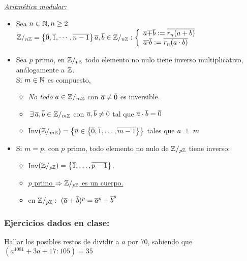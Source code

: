 \textit{\underline{Aritmética modular:}}

\newcommand{\moduloN}[1]{\enteros/_{#1\enteros}}

\begin{itemize}
	\item Sea $n \in \mathbb N, n\geq2$\\
	      $
		      \moduloN{n} = \set{\clase{0},\clase{1},\cdots, \clase{n-1} }\\
		      \clase{a},\clase{b} \en \moduloN n:
		      \llave{l}{
			      \clase{a} \clase{+} \clase{b} := \overline{r_n(a+b)} \\
			      \clase{a} \clase{\cdot} \clase{b} := \overline{r_n(a\cdot b)}
		      }
	      $
	\item Sea $p$ primo, en $\moduloN{p}$ todo elemento no nulo tiene inverso multiplicativo,
	      análogamente a $\mathbb Z$.\\
	      Si $m \in \mathbb N$ es compuesto,

	      \begin{itemize}
		      \item \textit{No todo} $\clase{a} \en \moduloN{m}$ con $\overline{a} \neq \overline{0}$ es inversible.

		      \item $\existe \clase{a}, \clase{b} \en \moduloN{m}$ con $\overline{a}, \overline{b} \neq 0$ tal que
		            $\overline{a}\cdot \overline{b} = \overline{0}$

		      \item Inv$(\moduloN m) = \set{\clase{a} \en \set{\clase{0},\clase{1},\dots, \clase{m-1}}}$ tales que
		            $a \, \perp \, m$
	      \end{itemize}
	\item Si $m = p$, con $p$ primo, todo elemento no nulo de $\moduloN p$ tiene inverso:
	      \begin{itemize}
		      \item Inv$(\moduloN p) = \set{\clase{1},\dots, \clase{p-1}}$.
		      \item  \underline{$p$ primo $\entonces \moduloN p$ es un cuerpo.}
              \item en $\moduloN{p}:\ (\clase{a} + \clase{b})^p = \clase{a}^p + \clase{b}^p $
	      \end{itemize}

\end{itemize}



\subsubsection*{Ejercicios dados en clase:}
\ejercicio Hallar los posibles restos de dividir a $a$ por 70, sabiendo que $(a^{1081}+ 3a + 17 : 105) = 35$\\

